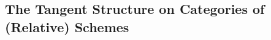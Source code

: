 \documentclass{amsart}
\theoremstyle{definition}
\DeclareMathOperator{\Ascr}{\mathscr{A}}
\DeclareMathOperator{\Fscr}{\mathscr{F}}
\DeclareMathOperator{\Vbb}{\mathbb{V}}
\DeclareMathOperator{\Ocal}{\mathcal{O}}
\DeclareMathOperator{\sym}{Sym}
\DeclareMathOperator{\op}{op}
\DeclareMathOperator{\und}{Und}
\DeclareMathOperator{\Spec}{Spec}
\newcommand{\CAlg}[1]{\mathbf{CAlg}_{#1}}
\newcommand{\Und}[1]{\und_{#1}}
\newcommand{\Sym}[1]{\sym_{#1}}
\newcommand{\RelSpec}[1]{\underline{\Spec}_{#1}}
\newcommand{\RelSym}[1]{\underline{\sym}_{{#1}}}
\newcommand{\RelUnd}[1]{\underline{\und}_{{#1}}}
\DeclareMathOperator{\QCoh}{\mathbf{QCoh}}
\numberwithin{equation}{subsection}
\begin{document}
\subsection{The Tangent Structure on Categories of (Relative) Schemes}\label{Subsection: Tangent Category of Schemes}


\end{document}
